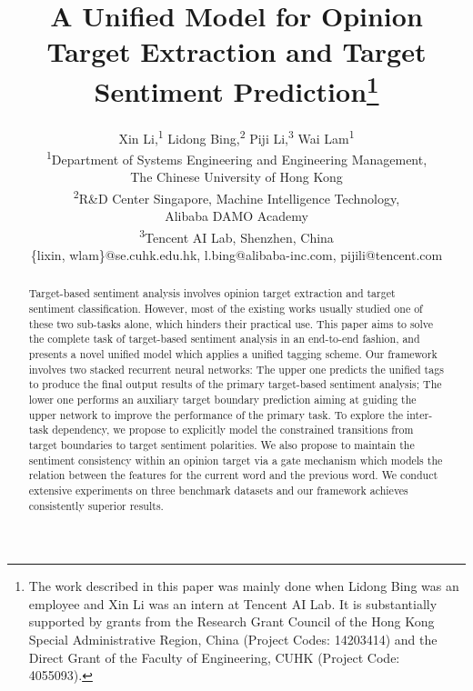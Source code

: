 \documentclass[letterpaper]{article} %
\begin{document}
%
\title{A Unified Model for Opinion Target Extraction and Target Sentiment Prediction\thanks{The work described in this paper was mainly done when Lidong Bing was an employee and Xin Li was an intern at Tencent AI Lab. It is substantially supported by grants from the Research Grant Council of the Hong Kong Special Administrative Region, China (Project Codes: 14203414) and the Direct Grant of the Faculty of Engineering, CUHK (Project Code: 4055093).}}
\author{
Xin Li,\textsuperscript{\rm 1}
Lidong Bing,\textsuperscript{\rm 2}
Piji Li,\textsuperscript{\rm 3}
Wai Lam\textsuperscript{\rm 1}\\
\textsuperscript{\rm 1}Department of Systems Engineering and Engineering Management,\\ The Chinese University of Hong Kong\\
\textsuperscript{\rm 2}R\&D Center Singapore, Machine Intelligence Technology, \\ Alibaba DAMO Academy\\
\textsuperscript{\rm 3}Tencent AI Lab, Shenzhen, China \\
\{lixin, wlam\}@se.cuhk.edu.hk, l.bing@alibaba-inc.com, pijili@tencent.com
}
\maketitle
\begin{abstract}
Target-based sentiment analysis involves opinion target extraction and target sentiment classification. However, most of the existing works usually studied one of these two sub-tasks alone, which hinders their practical use. This paper aims to solve the complete task of target-based sentiment analysis in an end-to-end fashion, and presents a novel unified model which applies a unified tagging scheme. Our framework involves two stacked recurrent neural networks: The upper one predicts the unified tags to produce the final output results of the primary target-based sentiment analysis; The lower one performs an auxiliary target boundary prediction aiming at guiding the upper network to improve the performance of the primary task. To explore the inter-task dependency, we propose to explicitly model the constrained transitions from target boundaries to target sentiment polarities. We also propose to maintain the sentiment consistency within an opinion target via a gate mechanism which models the relation between the features for the current word and the previous word. We conduct extensive experiments on three benchmark datasets and our framework achieves consistently superior results.
\end{abstract}
\end{document}
